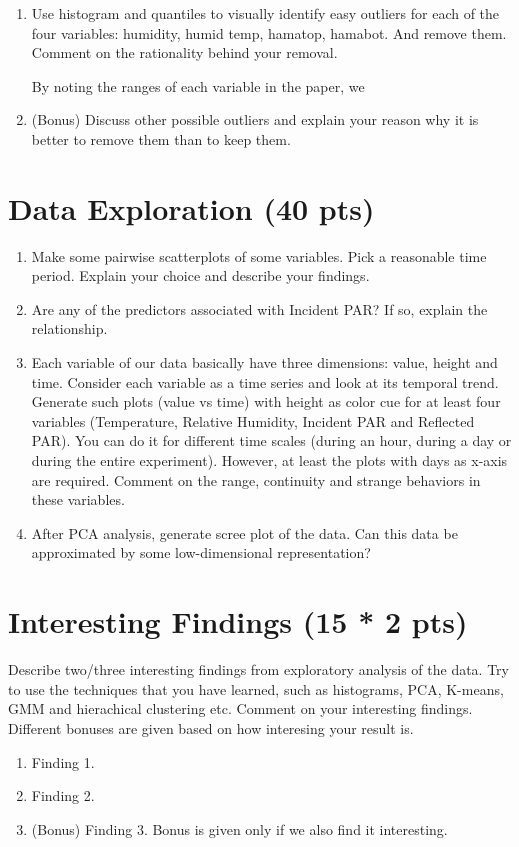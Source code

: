 \documentclass[11pt]{article}
\begin{document}
\begin{enumerate}[label=(\alph*)]
\item Use histogram and quantiles to visually identify easy outliers for each of the four variables: humidity, humid temp, hamatop, hamabot. And remove them. Comment on the rationality behind your removal.

By noting the ranges of each variable in the paper, we


\item (Bonus) Discuss other possible outliers and explain your reason why it is better to remove them than to keep them.
\end{enumerate}

\section{Data Exploration (40 pts)}
\begin{enumerate}[label=(\alph*)]
\item Make some pairwise scatterplots of some variables. Pick a reasonable time period. Explain your choice and describe your findings.
\item Are any of the predictors associated with Incident PAR? If so, explain the relationship.
\item Each variable of our data basically have three dimensions: value, height and time. Consider each variable as a time series and look at its temporal trend. Generate such plots (value vs time) with height as color cue for at least four variables (Temperature, Relative Humidity, Incident PAR and Reflected PAR). You can do it for different time scales (during an hour, during a day or during the entire experiment). However, at least the plots with days as x-axis are required. Comment on the range, continuity and strange behaviors in these variables.
\item After PCA analysis, generate scree plot of the data. Can this data be approximated by some low-dimensional representation?
\end{enumerate}

\section{Interesting Findings (15 * 2 pts)}
Describe two/three interesting findings from exploratory analysis of the data. Try to use the techniques that you have learned, such as histograms, PCA, K-means, GMM and hierachical clustering etc. Comment on your interesting findings. Different bonuses are given based on how interesing your result is.
\begin{enumerate}[label=(\alph*)]
\item Finding 1.
\item Finding 2.
\item (Bonus) Finding 3. Bonus is given only if we also find it interesting.
\end{enumerate}
\end{document}
